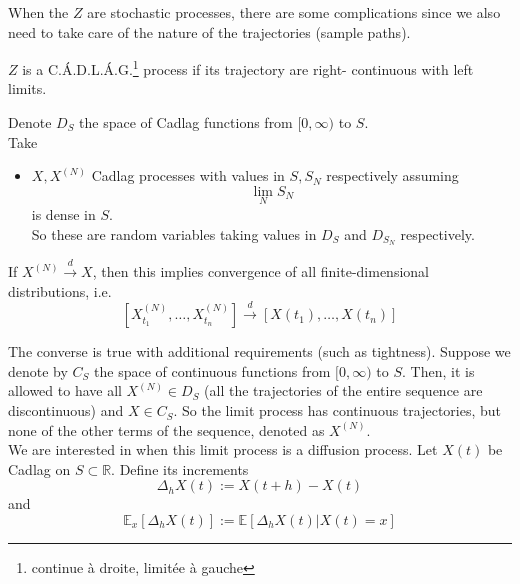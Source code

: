 \documentclass{article}
\begin{document}
When the $Z$ are stochastic processes, there are some complications since we also need to take care of the nature of the trajectories (sample paths).
\begin{definition}
		$Z$ is a C.\'A.D.L.\'A.G.\footnote{continue à droite, limitée à gauche} process if its trajectory are right- continuous with left limits. 
\end{definition}
\begin{example}
	Denote $D_S$ the space of Cadlag functions from $[0,\infty)$ to $S$. \\
	Take 
	\begin{itemize}
		\item $X, X^{(N)}$ Cadlag processes with values in $S, S_N$ respectively assuming 
		\begin{equation*}
			\lim_N S_N
		\end{equation*}
		is dense in $S$. \\
		So these are random variables taking values in $D_S$ and $D_{S_N}$ respectively.
	\end{itemize}
	If $X^{(N)} \xrightarrow{d} X$, then this implies convergence of all finite-dimensional distributions, i.e.
	\begin{equation*}
		\left[X^{(N)}_{t_1}, \ldots, X^{(N)}_{t_n}\right] \xrightarrow{d} \left[X(t_1), \ldots, X(t_n)\right]
	\end{equation*}
\end{example}
The converse is true with additional requirements (such as tightness). Suppose we denote by $C_S$ the space of continuous functions from $[0,\infty)$ to $S$. Then, it is allowed to have all $X^{(N)} \in D_S$ (all the trajectories of the entire sequence are discontinuous) and $X \in C_S$. So the limit process has continuous trajectories, but none of the other terms of the sequence, denoted as $X^{(N)}$. \\
We are interested in when this limit process is a diffusion process. Let $X(t)$ be Cadlag on $S \subset \mathbb{R}$. Define its increments 
\begin{equation*}
	\Delta_h X(t):= X(t+h)-X(t)
\end{equation*}
and 
\begin{equation*}
	\mathbb{E}_x[\Delta _h X(t)]:= \mathbb{E}[\Delta_h X(t) | X(t) = x]
\end{equation*}
\end{document}
